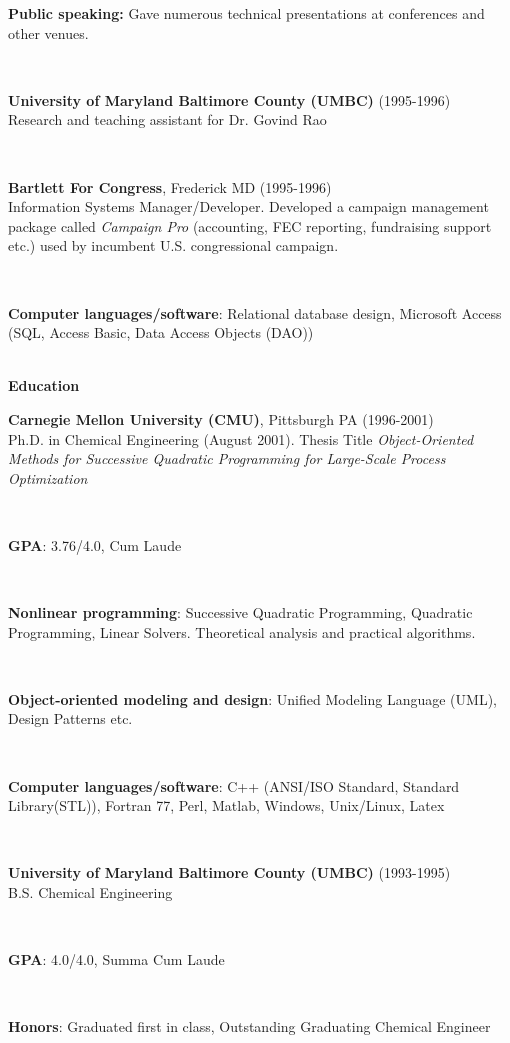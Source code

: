 \documentclass{report}
\newcommand{\itemvs}{1ex}
\newcommand{\sectitlevs}{1.2ex}
\newcommand{\indentone}{0.5in}
\newcommand{\widthone}{6.4in}
\newcommand{\pboxone}{\hspace*{\indentone}\parbox[t]{\widthone}}
\newcommand{\indenttwo}{0.75in}
\newcommand{\widthtwo}{6.15in}
\newcommand{\pboxtwo}{\hspace*{\indenttwo}\parbox[t]{\widthtwo}}
\begin{document}
%
{}\pboxtwo{\textbf{Public speaking:} Gave numerous technical presentations at conferences and other venues.} \\[\sectitlevs]
%
{}\pboxone{\textbf{University of Maryland Baltimore County (UMBC)} (1995-1996)\\ Research and teaching assistant for Dr. Govind Rao}\\[\sectitlevs]
%
{}\pboxone{\textbf{Bartlett For Congress}, Frederick MD (1995-1996)\\
Information Systems Manager/Developer.  Developed a campaign management package called \textit{Campaign Pro} (accounting, FEC reporting, fundraising support etc.) used by incumbent U.S. congressional campaign.}\\[\itemvs]
%
{}\pboxtwo{\textbf{Computer languages/software}: Relational database design, Microsoft Access (SQL, Access Basic, Data Access Objects (DAO))} \\[\sectitlevs]
%
\textbf{\Large Education}\\[\sectitlevs]
%
{}\pboxone{\textbf{Carnegie Mellon University (CMU)}, Pittsburgh PA (1996-2001)\\ Ph.D. in Chemical Engineering (August 2001).  Thesis Title {}\textit{Object-Oriented Methods for Successive Quadratic Programming for Large-Scale Process Optimization}}\\[\itemvs]
%
{}\pboxtwo{\textbf{GPA}: 3.76/4.0, Cum Laude} \\[\itemvs]
%
{}\pboxtwo{\textbf{Nonlinear programming}: Successive Quadratic Programming, Quadratic Programming, Linear Solvers.  Theoretical analysis and practical algorithms.} \\[\itemvs]
%
{}\pboxtwo{\textbf{Object-oriented modeling and design}: Unified Modeling Language (UML), Design Patterns etc.}\\[\itemvs]
%
{}\pboxtwo{\textbf{Computer languages/software}: C++ (ANSI/ISO Standard, Standard Library(STL)), Fortran 77, Perl, Matlab, Windows, Unix/Linux, Latex}\\[\itemvs]
%
{}\pboxone{\textbf{University of Maryland Baltimore County (UMBC)} (1993-1995) \\ B.S. Chemical Engineering} \\[\itemvs]
%
{}\pboxtwo{\textbf{GPA}: 4.0/4.0, Summa Cum Laude} \\[\itemvs]
%
{}\pboxtwo{\textbf{Honors}: Graduated first in class, Outstanding Graduating Chemical Engineer} \\[\itemvs]
%
\end{document}
